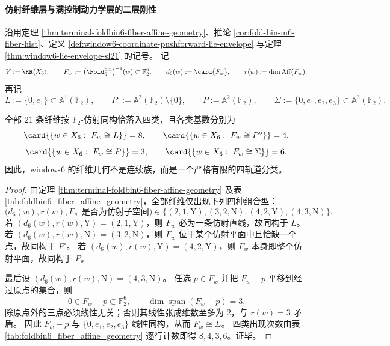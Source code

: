 \paragraph{仿射纤维层与满控制动力学层的二层刚性}
沿用定理 \ref{thm:terminal-foldbin6-fiber-affine-geometry}、推论 \ref{cor:fold-bin-m6-fiber-hist}、定义 \ref{def:window6-coordinate-pushforward-lie-envelope} 与定理 \ref{thm:window6-lie-envelope-sl21} 的记号。
记
\[
V:=\RR\langle X_6\rangle,\qquad
F_w:=\bigl(\Fold^{\mathrm{bin}}_6\bigr)^{-1}(w)\subset \mathbb F_2^6,
\qquad
d_6(w):=\card{F_w},
\qquad
r(w):=\dim \operatorname{Aff}(F_w).
\]
再记
\[
L:=\{0,e_1\}\subset \mathbb A^1(\mathbb F_2),\qquad
P^\circ:=\mathbb A^2(\mathbb F_2)\setminus\{0\},\qquad
P:=\mathbb A^2(\mathbb F_2),\qquad
\Sigma:=\{0,e_1,e_2,e_3\}\subset \mathbb A^3(\mathbb F_2).
\]

\begin{theorem}\label{thm:window6-affine-fiber-orbit-classification}
全部 \(21\) 条纤维按 \(\mathbb F_2\)-仿射同构恰落入四类，且各类基数分别为
\[
\card{\{w\in X_6:\ F_w\cong L\}}=8,\qquad
\card{\{w\in X_6:\ F_w\cong P^\circ\}}=4,
\]
\[
\card{\{w\in X_6:\ F_w\cong P\}}=3,\qquad
\card{\{w\in X_6:\ F_w\cong \Sigma\}}=6.
\]
因此，window-\(6\) 的纤维几何不是连续族，而是一个严格有限的四轨道分类。
\end{theorem}
\begin{proof}
由定理 \ref{thm:terminal-foldbin6-fiber-affine-geometry} 及表 \ref{tab:foldbin6_fiber_affine_geometry}，全部纤维仅出现下列四种组合型：
\[
\bigl(d_6(w),r(w),\text{\(F_w\) 是否为仿射子空间}\bigr)
\in
\{(2,1,\mathrm{Y}),(3,2,\mathrm{N}),(4,2,\mathrm{Y}),(4,3,\mathrm{N})\}.
\]
若 \((d_6(w),r(w),\mathrm{Y})=(2,1,\mathrm{Y})\)，则 \(F_w\) 必为一条仿射直线，故同构于 \(L\)。
若 \((d_6(w),r(w),\mathrm{N})=(3,2,\mathrm{N})\)，则 \(F_w\) 位于某个仿射平面中且恰缺一个点，故同构于 \(P^\circ\)。
若 \((d_6(w),r(w),\mathrm{Y})=(4,2,\mathrm{Y})\)，则 \(F_w\) 本身即整个仿射平面，故同构于 \(P\)。

最后设 \((d_6(w),r(w),\mathrm{N})=(4,3,\mathrm{N})\)。
任选 \(p\in F_w\) 并把 \(F_w-p\) 平移到经过原点的集合，则
\[
0\in F_w-p\subset \mathbb F_2^6,\qquad \dim\operatorname{span}(F_w-p)=3.
\]
除原点外的三点必须线性无关；否则其线性张成维数至多为 \(2\)，与 \(r(w)=3\) 矛盾。
因此 \(F_w-p\) 与 \(\{0,e_1,e_2,e_3\}\) 线性同构，从而 \(F_w\cong \Sigma\)。
四类出现次数由表 \ref{tab:foldbin6_fiber_affine_geometry} 逐行计数即得 \(8,4,3,6\)。证毕。
\end{proof}

